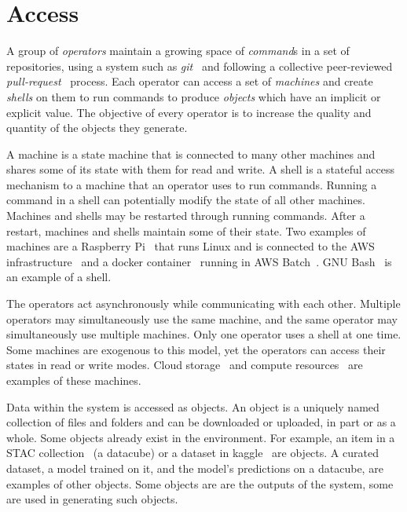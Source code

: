 \section{Access}

A group of \emph{operators} maintain a growing space of \emph{command}s in a set of repositories, using a system such as \emph{git}~\cite{git} and following a collective peer-reviewed \emph{pull-request}~\cite{pull_request} process. Each operator can access a set of \emph{machines} and create \emph{shells} on them to run commands to produce \emph{objects} which have an implicit or explicit value. The objective of every operator is to increase the quality and quantity of the objects they generate.

A machine is a state machine that is connected to many other machines and shares some of its state with them for read and write. A shell is a stateful access mechanism to a machine that an operator uses to run commands. Running a command in a shell can potentially modify the state of all other machines. Machines and shells may be restarted through running commands. After a restart, machines and shells maintain some of their state. Two examples of machines are a Raspberry Pi~\cite{rpi} that runs Linux and is connected to the AWS infrastructure~\cite{aws} and a docker container~\cite{docker} running in AWS Batch~\cite{aws_batch}. GNU Bash~\cite{gnu_bash} is an example of a shell.

The operators act asynchronously while communicating with each other. Multiple operators may simultaneously use the same machine, and the same operator may simultaneously use multiple machines. Only one operator uses a shell at one time. Some machines are exogenous to this model, yet the operators can access their states in read or write modes. Cloud storage~\cite{aws_s3} and compute resources~\cite{aws_batch} are examples of these machines.

Data within the system is accessed as objects. An object is a uniquely named collection of files and folders and can be downloaded or uploaded, in part or as a whole. Some objects already exist in the environment. For example, an item in a STAC collection~\cite{stac_intro_tutorial} (a datacube) or a dataset in kaggle~\cite{chen2019-AIRD-dataset} are objects. A curated dataset, a model trained on it, and the model's predictions on a datacube, are examples of other objects. Some objects are are the outputs of the system, some are used in generating such objects.

